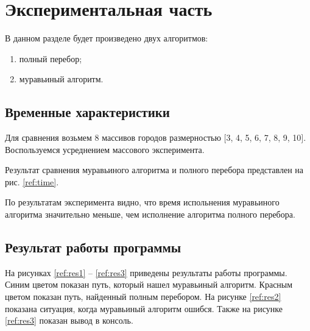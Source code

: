\chapter{Экспериментальная часть}

В данном разделе будет произведено двух алгоритмов:

\begin{enumerate}
	\item полный перебор;
	\item муравьиный алгоритм.
\end{enumerate}

\section{Временные характеристики}

Для сравнения возьмем 8 массивов городов размерностью
$[$3, 4, 5, 6, 7, 8, 9, 10$]$.
Воспользуемся усреднением массового эксперимента.

Результат сравнения муравьиного алгоритма и полного перебора представлен на рис. \ref{ref:time}.

\begin{figure}[ht!]
\end{figure}

По результатам эксперимента видно, что время испольнения муравьиного алгоритма
значительно меньше, чем исполнение алгоритма полного перебора.

\newpage

\section{Результат работы программы}

На рисунках \ref{ref:res1} -- \ref{ref:res3} приведены результаты работы программы.
Синим цветом показан путь, который нашел муравьиный алгоритм.
Красным цветом показан путь, найденный полным перебором.
На рисунке \ref{ref:res2} показана ситуация, когда муравьиный алгоритм ошибся.
Также на рисунке \ref{ref:res3} показан вывод в консоль.

\begin{figure}[ht!]
\end{figure}

\begin{figure}[ht!]
\end{figure}


